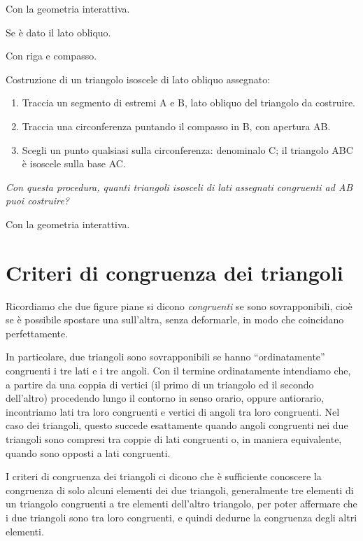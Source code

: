 Con la geometria interattiva.


Se è dato il lato obliquo.

Con riga e compasso.

 \begin{procedura}
   Costruzione di un triangolo isoscele di lato obliquo assegnato:
   \begin{enumerate} [nosep]
     \item 
     Traccia un segmento di estremi A e B, lato obliquo del triangolo da 
costruire.  
     \item 
     Traccia una circonferenza puntando il compasso in B, con apertura AB.  
     \item 
     Scegli un punto qualsiasi sulla circonferenza: denominalo C; il triangolo 
ABC è isoscele sulla base AC.  
   \end{enumerate}
   \textit{ Con questa procedura, quanti triangoli isosceli di lati assegnati 
congruenti ad AB puoi costruire?}  
 \end{procedura}
 
Con la geometria interattiva.


\section{Criteri di congruenza dei triangoli}
\label{sect:primo_secondo_criterio_di_congruenza_triangoli}

Ricordiamo che due figure piane si dicono \emph{congruenti} se sono 
sovrapponibili, cioè se è possibile spostare una sull'altra, senza 
deformarle, in modo che coincidano perfettamente. 

In particolare, due triangoli sono sovrapponibili se hanno 
``ordinatamente'' congruenti i tre lati e i tre angoli. Con il 
termine ordinatamente intendiamo che, a partire da una coppia di 
vertici (il primo di un triangolo ed il secondo dell'altro) procedendo 
lungo il contorno in senso orario, oppure antiorario, incontriamo lati 
tra loro congruenti e vertici di angoli tra loro congruenti. Nel caso 
dei triangoli, questo succede esattamente quando angoli congruenti nei 
due triangoli sono compresi tra coppie di lati congruenti o, in 
maniera equivalente, quando sono opposti a lati congruenti.

I criteri di congruenza dei triangoli ci dicono che è sufficiente 
conoscere la congruenza di solo alcuni elementi dei due triangoli, 
generalmente tre elementi di un triangolo congruenti a tre elementi 
dell'altro triangolo, per poter affermare che i due triangoli sono 
tra loro congruenti, e quindi dedurne la congruenza degli altri 
elementi.

